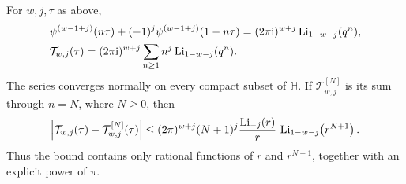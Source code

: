 \begin{theorem}
\label{thm:modular-rows-tail}
For \(w,j,\tau\) as above,
\begin{align}
&\psi^{(w-1+j)}(n\tau)
 +(-1)^j\psi^{(w-1+j)}(1-n\tau)
 =(2\pi\mathrm{i})^{w+j}\operatorname{Li}_{1-w-j}(q^n),
\label{eq:modular-single-row}\\
&\mathcal T_{w,j}(\tau)
 =(2\pi\mathrm{i})^{w+j}\sum_{n\ge1}n^j\operatorname{Li}_{1-w-j}(q^n).
\label{eq:modular-rational-rows}
\end{align}
The series converges normally on every compact subset of \(\mathbb H\).
If \(\mathcal T_{w,j}^{[N]}\) is its sum through \(n=N\), where
\(N\ge0\), then
\begin{equation}
\left|\mathcal T_{w,j}(\tau)-\mathcal T_{w,j}^{[N]}(\tau)\right|
\le (2\pi)^{w+j}(N+1)^j
 \frac{\operatorname{Li}_{-j}(r)}{r}\,
 \operatorname{Li}_{1-w-j}\!\left(r^{N+1}\right).
\label{eq:modular-tail-bound}
\end{equation}
Thus the bound contains only rational functions of \(r\) and
\(r^{N+1}\), together with an explicit power of \(\pi\).
\end{theorem}

